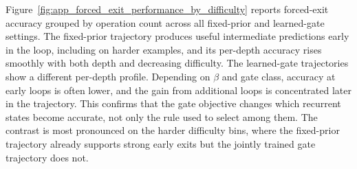 \documentclass[10pt]{article} %
\begin{document}
Figure~\ref{fig:app_forced_exit_performance_by_difficulty} reports forced-exit accuracy grouped by operation count across all fixed-prior and learned-gate settings. The fixed-prior trajectory produces useful intermediate predictions early in the loop, including on harder examples, and its per-depth accuracy rises smoothly with both depth and decreasing difficulty. The learned-gate trajectories show a different per-depth profile. Depending on $\beta$ and gate class, accuracy at early loops is often lower, and the gain from additional loops is concentrated later in the trajectory. This confirms that the gate objective changes which recurrent states become accurate, not only the rule used to select among them. The contrast is most pronounced on the harder difficulty bins, where the fixed-prior trajectory already supports strong early exits but the jointly trained gate trajectory does not.
\end{document}
